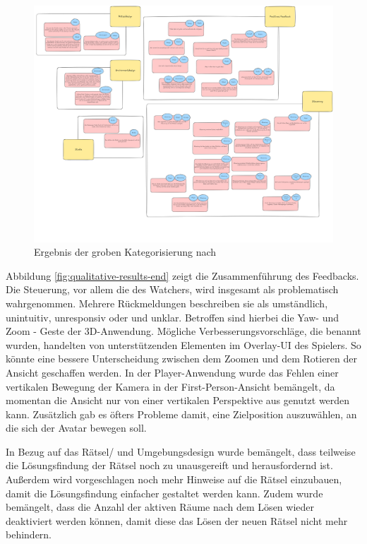 \begin{figure}[ht]
\centering
\includegraphics[width=1\linewidth]{content/pictures/Qualitative-Auswertung-Schritt-1.png}
\caption{Ergebnis der groben Kategorisierung nach \cite{braun_using_2006}}
\label{fig:qualitative-results}
\end{figure}

Abbildung \ref{fig:qualitative-results-end} zeigt die Zusammenführung des Feedbacks. 
Die Steuerung, vor allem die des Watchers, wird insgesamt als problematisch wahrgenommen. Mehrere Rückmeldungen beschreiben sie als umständlich, unintuitiv, unresponsiv oder  und unklar. Betroffen sind hierbei die Yaw- und Zoom - Geste der \ac{3D}-Anwendung. Mögliche Verbesserungsvorschläge, die benannt wurden, handelten von unterstützenden Elementen im Overlay-\ac{UI} des Spielers. So könnte eine bessere Unterscheidung zwischen dem Zoomen und dem Rotieren der Ansicht geschaffen werden. 
In der Player-Anwendung wurde das Fehlen einer vertikalen Bewegung der Kamera in der First-Person-Ansicht bemängelt, da momentan die Ansicht nur von einer vertikalen Perspektive aus genutzt werden kann. Zusätzlich gab es öfters Probleme damit, eine Zielposition auszuwählen, an die sich der Avatar bewegen soll.

In Bezug auf das Rätsel/ und Umgebungsdesign wurde bemängelt, dass teilweise die Lösungsfindung der Rätsel noch zu unausgereift und herausfordernd ist. 
Außerdem wird vorgeschlagen noch mehr Hinweise auf die Rätsel einzubauen, damit die Lösungsfindung einfacher gestaltet werden kann. Zudem wurde bemängelt, dass die Anzahl der aktiven Räume nach dem Lösen wieder deaktiviert werden können, damit diese das Lösen der neuen Rätsel nicht mehr behindern.

